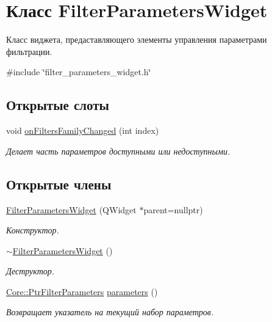 \hypertarget{class_filter_parameters_widget}{}\section{Класс Filter\+Parameters\+Widget}
\label{class_filter_parameters_widget}


Класс виджета, предаставляющего элементы управления параметрами фильтрации.  




{\ttfamily \#include \char`\"{}filter\+\_\+parameters\+\_\+widget.\+h\char`\"{}}

\subsection*{Открытые слоты}
\begin{DoxyCompactItemize}
\item 
void \hyperlink{class_filter_parameters_widget_a64e5feb9fe8915417d9e753243d74c84}{on\+Filters\+Family\+Changed} (int index)
\begin{DoxyCompactList}\small\item\em Делает часть параметров доступными или недоступными. \end{DoxyCompactList}\end{DoxyCompactItemize}
\subsection*{Открытые члены}
\begin{DoxyCompactItemize}
\item 
\hypertarget{class_filter_parameters_widget_ade6b317bb498ff3785cbf380ada8b214}{}\label{class_filter_parameters_widget_ade6b317bb498ff3785cbf380ada8b214} 
\hyperlink{class_filter_parameters_widget_ade6b317bb498ff3785cbf380ada8b214}{Filter\+Parameters\+Widget} (Q\+Widget $\ast$parent=nullptr)
\begin{DoxyCompactList}\small\item\em Конструктор. \end{DoxyCompactList}\item 
\hypertarget{class_filter_parameters_widget_ab3394a4f66caf8faa7886b55bba647e1}{}\label{class_filter_parameters_widget_ab3394a4f66caf8faa7886b55bba647e1} 
\hyperlink{class_filter_parameters_widget_ab3394a4f66caf8faa7886b55bba647e1}{$\sim$\+Filter\+Parameters\+Widget} ()
\begin{DoxyCompactList}\small\item\em Деструктор. \end{DoxyCompactList}\item 
\hypertarget{class_filter_parameters_widget_a39ed363f640272273b3e4eb82bc75a21}{}\label{class_filter_parameters_widget_a39ed363f640272273b3e4eb82bc75a21} 
\hyperlink{namespace_core_a4811af8148ba137d644b9a61a042cf03}{Core\+::\+Ptr\+Filter\+Parameters} \hyperlink{class_filter_parameters_widget_a39ed363f640272273b3e4eb82bc75a21}{parameters} ()
\begin{DoxyCompactList}\small\item\em Возвращает указатель на текущий набор параметров. \end{DoxyCompactList}\end{DoxyCompactItemize}
